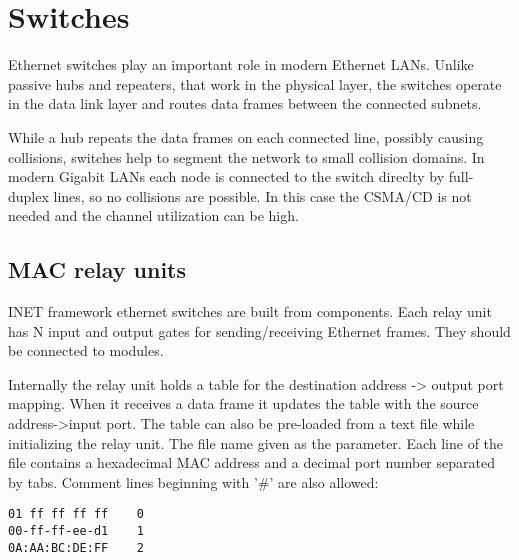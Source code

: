 


\section{Switches}

Ethernet switches play an important role in modern Ethernet LANs. Unlike
passive hubs and repeaters, that work in the physical layer, the switches
operate in the data link layer and routes data frames between the connected
subnets.

While a hub repeats the data frames on each connected line, possibly causing
collisions, switches help to segment the network to small collision domains.
In modern Gigabit LANs each node is connected to the switch direclty
by full-duplex lines, so no collisions are possible. In this case the
CSMA/CD is not needed and the channel utilization can be high.

\subsection{MAC relay units}

INET framework ethernet switches are built from 
components. Each relay unit has N input and output gates for sending/receiving
Ethernet frames. They should be connected to  modules.

Internally the relay unit holds a table for the destination address -> output
port mapping. When it receives a data frame it updates the table with the
source address->input port. The table can also be pre-loaded from a text file
while initializing the relay unit. The file name given as the 
parameter. Each line of the file contains a hexadecimal MAC address and a decimal port
number separated by tabs. Comment lines beginning with '\#' are also allowed:

\begin{verbatim}
01 ff ff ff ff    0
00-ff-ff-ee-d1    1
0A:AA:BC:DE:FF    2
\end{verbatim}


